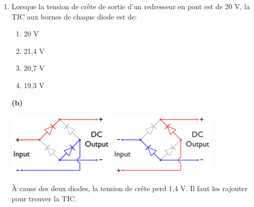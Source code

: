 \documentclass[a4paper]{article}
\begin{document}
\begin{enumerate}
\begin{example}
\begin{center}
    \end{center}
\end{example}





\item Lorsque la tension de crête de sortie d’un redresseur en pont est de 20 V, la TIC aux bornes de chaque diode est de:
\begin{enumerate}
    \item 20 V
    \item 21,4 V
    \item 20,7 V
    \item 19,3 V
\end{enumerate}
\begin{example}
    \textbf{(b)}

    \begin{center}
        \includegraphics[width=0.4\textwidth]{images/pont-graetz-1.PNG}
        \hspace{2cm}
        \includegraphics[width=0.4\textwidth]{images/pont-graetz-2.PNG}
    \end{center}
    À cause des deux diodes, la tension de crête perd 1,4 V. Il faut les rajouter pour trouver la TIC.
\end{example}






\end{enumerate}
\end{document}
